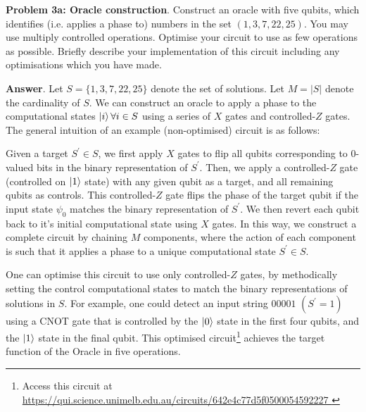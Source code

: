 \textbf{Problem 3a: Oracle construction}. Construct an oracle with five qubits, which identifies (i.e. applies a phase to) numbers in the set $(1, 3, 7, 22, 25)$. 
You may use multiply controlled operations.
Optimise your circuit to use as few operations as possible. 
Briefly describe your implementation of this circuit including any optimisations which you have made.


\textbf{Answer}. Let $S = \{1, 3, 7, 22, 25\}$ denote the set of solutions. 
Let $M=|S|$ denote the cardinality of $S$.
We can construct an oracle to apply a phase to the computational states $\ket{i} \forall i \in S$ using a series of $X$ gates and controlled-$Z$ gates. The general intuition of an example (non-optimised) circuit is as follows: 

Given a target $S^\prime \in S$, we first apply $X$ gates to flip all qubits corresponding to $0$-valued bits in the binary representation of $S^\prime$. 
Then, we apply a controlled-$Z$ gate (controlled on $\ket{1}$ state) with any given qubit as a target, and all remaining qubits as controls.
This controlled-$Z$ gate flips the phase of the target qubit if the input state $\psi_0$ matches the binary representation of $S^\prime$.
We then revert each qubit back to it's initial computational state using $X$ gates.
In this way, we construct a complete circuit by chaining $M$ components, where the action of each component is such that it applies a phase to a unique computational state $S^\prime \in S$.

One can optimise this circuit to use only controlled-$Z$ gates, by methodically setting the control computational states to match the binary representations of solutions in $S$.
For example, one could detect an input string $00001$ $(S^\prime=1)$ using a CNOT gate that is controlled by the $\ket{0}$ state in the first four qubits, and the $\ket{1}$ state in the final qubit.
This optimised circuit\footnote{Access this circuit at \url{https://qui.science.unimelb.edu.au/circuits/642e4c77d5f0500054592227
}} achieves the target function of the Oracle in five operations.

